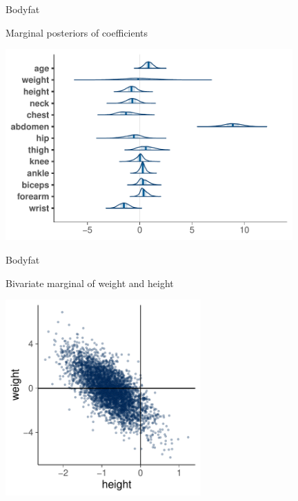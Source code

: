 \documentclass[english,t]{beamer}
\begin{document}
\begin{frame}
  
  {\Large\color{navyblue} Bodyfat}

  Marginal posteriors of coefficients
  
  \includegraphics[width=11cm]{bodyfat_mcmc_areas.pdf}

\end{frame}

\begin{frame}
  
  {\Large\color{navyblue} Bodyfat}

  Bivariate marginal of weight and height
  
  \includegraphics[width=7.5cm]{bodyfat_mcmc_scatter.pdf}

\end{frame}
\end{document}
